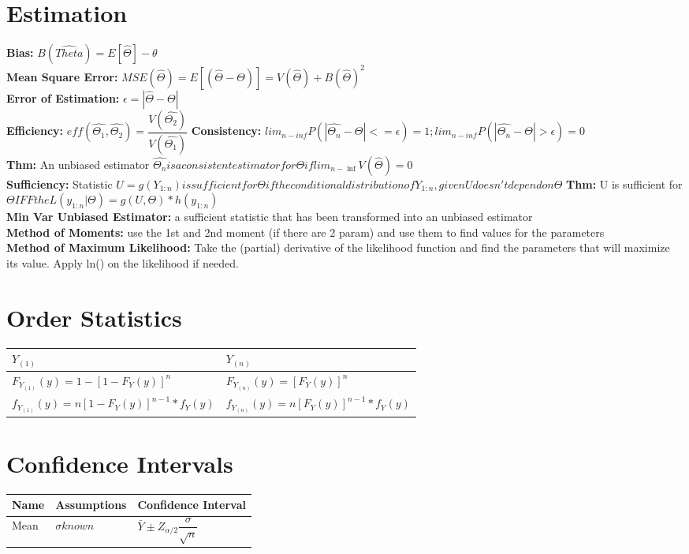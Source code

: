 \documentclass{article}
\begin{document}
\begin{multicols}{2}
\section{Estimation}
\textbf{Bias:} $B(\hat{Theta}) = E[\hat{\Theta}] - \theta$ \\
\textbf{Mean Square Error:} 
$MSE(\hat{\Theta}) = E[(\hat{\Theta} - \Theta)] = V(\hat{\Theta}) + B(\hat{\Theta})^2$ \\
\textbf{Error of Estimation:} $\epsilon = |\hat{\Theta} - \Theta|$\\
\textbf{Efficiency:} $eff(\hat{\Theta_1}, \hat{\Theta_2}) = \dfrac{V(\hat{\Theta_2})}{V(\hat{\Theta_1})}$
\textbf{Consistency:} $lim_{n-inf}P(|\hat{\Theta_n}-\Theta|<= \epsilon) = 1; lim_{n-inf}P(|\hat{\Theta_n}-\Theta|> \epsilon) = 0$ \\
\textbf{Thm:} An unbiased estimator $\hat{\Theta_n} is a consistent estimator for \Theta if lim_{n-\inf}V(\hat{\Theta}) = 0$ \\
\textbf{Sufficiency:} Statistic $U = g(Y_{1:n}) is sufficient for \Theta if the conditional distribution of Y_{1:n}, given U doesn't depend on \Theta$
\textbf{Thm:} U is sufficient for $\Theta IFF the L(y_{1:n}|\Theta) = g(U, \Theta)*h(y_{1:n})$\\
\textbf{Min Var Unbiased Estimator:} a sufficient statistic that has been transformed into an unbiased estimator\\
\textbf{Method of Moments:} use the 1st and 2nd moment (if there are 2 param) and use them to find values for the parameters\\
\textbf{Method of Maximum Likelihood:} Take the (partial) derivative of the likelihood function and find the parameters that will maximize its value. Apply ln() on the likelihood if needed.

\section{Order Statistics}
\begin{tabular}{|l|l|}
\hline
\textbf{$Y_{(1)}$} & \textbf{$Y_{(n)}$} \\ \hline
$F_{Y_{(1)}}(y) = 1-[1-F_Y(y)]^{n}$ & $F_{Y_{(n)}}(y) = [F_Y(y)]^{n}$\\ \hline
$f_{Y_{(1)}}(y) = n[1-F_Y(y)]^{n-1}*f_Y(y) $ &
$f_{Y_{(n)}}(y) = n[F_Y(y)]^{n-1}*f_Y(y) $\\ \hline
\end{tabular}

\section{Confidence Intervals}
\begin{tabular}{| l | l | l |}
\hline
Name & Assumptions & Confidence Interval \\ \hline
Mean & $\sigma known$ & $\bar{Y} \pm Z_{\alpha/2}\dfrac{\sigma}{\sqrt{n}}$ \\ \hline


\end{tabular}
\end{multicols}
\end{document}
